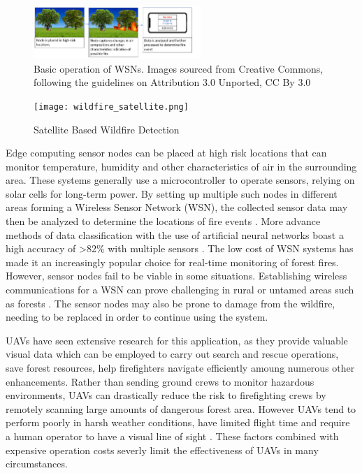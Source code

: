 \documentclass[lettersize,journal]{IEEEtran}
\begin{document}
\begin{figure}
        \centering
        \includegraphics[width=2.5in]{sensornode.png}
        \caption{Basic operation of WSNs. Images sourced from Creative Commons,
        following the guidelines on Attribution 3.0 Unported, CC By 3.0}
\end{figure}

\begin{figure}
        \centering
        \texttt{[image: wildfire\_satellite.png]}
        \caption{Satellite Based Wildfire Detection}
\end{figure}

Edge computing sensor nodes can be placed at high risk locations that
can monitor temperature, humidity and other characteristics of air in
the surrounding area. These systems generally use a microcontroller to
operate sensors, relying on solar cells for long-term power. By setting
up multiple such nodes in different areas forming a Wireless Sensor
Network (WSN), the collected sensor data may then be analyzed to
determine the locations of fire events \cite{MohapatraAnkita2022EWDT}.
More advance methods of data classification with the use of artificial
neural networks boast a high accuracy of \textgreater82\% with multiple
sensors \cite{wsnfire}. The low cost of WSN systems has made it an
increasingly popular choice for real-time monitoring of forest fires.
However, sensor nodes fail to be viable in some situations. Establishing
wireless communications for a WSN can prove challenging in rural or
untamed areas such as forests \cite{wsnyolo}. The sensor nodes may also
be prone to damage from the wildfire, needing to be replaced in order to
continue using the system.

UAVs have seen extensive research for this application, as they provide
valuable visual data which can be employed to carry out search and
rescue operations, save forest resources, help firefighters navigate
efficiently amoung numerous other enhancements. Rather than sending
ground crews to monitor hazardous environments, UAVs can drastically
reduce the risk to firefighting crews by remotely scanning large amounts
of dangerous forest area. However UAVs tend to perform poorly in harsh
weather conditions, have limited flight time and require a human
operator to have a visual line of sight \cite{uav}. These factors
combined with expensive operation costs severly limit the effectiveness
of UAVs in many circumstances.
\end{document}
